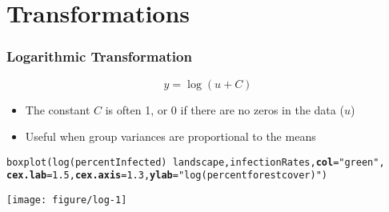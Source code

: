 \documentclass[color=usenames,dvipsnames]{beamer}\usepackage[]{graphicx}\usepackage[]{color}
\makeatletter
\newcommand{\hlnum}[1]{\textcolor[rgb]{0.69,0.494,0}{#1}}%
\newcommand{\hlstr}[1]{\textcolor[rgb]{0.749,0.012,0.012}{#1}}%
\newcommand{\hlopt}[1]{\textcolor[rgb]{0,0,0}{#1}}%
\newcommand{\hlstd}[1]{\textcolor[rgb]{0,0,0}{#1}}%
\newcommand{\hlkwc}[1]{\textcolor[rgb]{0,0,0}{\textbf{#1}}}%
\newcommand{\hlkwd}[1]{\textcolor[rgb]{0.004,0.004,0.506}{#1}}%
\newenvironment{kframe}{%
 \def\at@end@of@kframe{}%
 \ifinner\ifhmode%
  \def\at@end@of@kframe{\end{minipage}}%
  \begin{minipage}{\columnwidth}%
 \fi\fi%
 \def\FrameCommand##1{\hskip\@totalleftmargin \hskip-\fboxsep
 \colorbox{shadecolor}{##1}\hskip-\fboxsep
     \hskip-\linewidth \hskip-\@totalleftmargin \hskip\columnwidth}%
 \MakeFramed {\advance\hsize-\width
   \@totalleftmargin\z@ \linewidth\hsize
   \@setminipage}}%
 {\par\unskip\endMakeFramed%
 \at@end@of@kframe}
\newenvironment{knitrout}{}{} %
\makeatother
\begin{document}
\section{Transformations}








\begin{frame}[fragile]
  \frametitle{Logarithmic Transformation}
  \[
  y = \log(u + C)
  \]
  \begin{itemize}%
    \small %
    \item The constant $C$ is often 1, or 0 if there are no zeros in the data ($u$)
    \item Useful when group variances are proportional to the means
  \end{itemize}
  \pause
\begin{knitrout}\scriptsize
{}\color{fgcolor}\begin{kframe}
\begin{alltt}
\hlkwd{boxplot}\hlstd{(}\hlkwd{log}\hlstd{(percentInfected)}\hlopt{~}\hlstd{landscape, infectionRates,} \hlkwc{col}\hlstd{=}\hlstr{"green"}\hlstd{,}
        \hlkwc{cex.lab}\hlstd{=}\hlnum{1.5}\hlstd{,} \hlkwc{cex.axis}\hlstd{=}\hlnum{1.3}\hlstd{,} \hlkwc{ylab}\hlstd{=}\hlstr{"log(percent forest cover)"}\hlstd{)}
\end{alltt}
\end{kframe}

{\centering \texttt{[image: figure/log-1]} 

}



\end{knitrout}
\end{frame}



\end{document}
